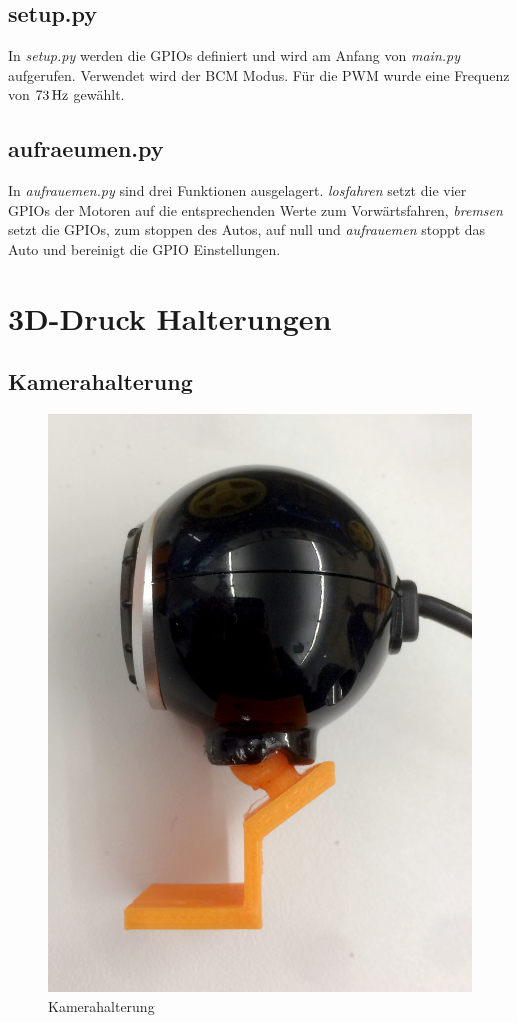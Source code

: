 \documentclass[a4paper, 12pt]{scrartcl}
\begin{document}
\newpage
\subsection{setup.py}	%


In \textit{setup.py} werden die GPIOs definiert und wird am Anfang von \textit{main.py} aufgerufen. Verwendet wird der BCM Modus. Für die PWM wurde eine Frequenz von $\unit[73]{Hz}$ gewählt.

\newpage
\subsection{aufraeumen.py}	%


In \textit{aufrauemen.py} sind drei Funktionen ausgelagert. \textit{losfahren} setzt die vier GPIOs der Motoren auf die entsprechenden Werte zum Vorwärtsfahren, \textit{bremsen} setzt die GPIOs, zum stoppen des Autos, auf null und \textit{aufrauemen} stoppt das Auto und bereinigt die GPIO Einstellungen.


\newpage
\section{3D-Druck Halterungen}

\subsection{Kamerahalterung}
\begin{figure}[ht!] \centering
	\includegraphics[width=.3\textwidth]{../bilder_videos/Kamerahalterung.png}
	\caption{Kamerahalterung}
	\label{kamerahalterung}
\end{figure}
\end{document}
